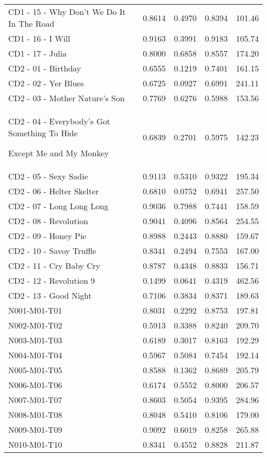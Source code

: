 \begin{longtable}[c]{|p{8cm}|c|l|l|l|}
CD1 - 15 - Why Don't We Do It In The Road & 0.8614 & 0.4970 & 0.8394 & 101.46 \\
CD1 - 16 - I Will & 0.9163 & 0.3991 & 0.9183 & 105.74 \\
CD1 - 17 - Julia & 0.8000 & 0.6858 & 0.8557 & 174.20 \\
CD2 - 01 - Birthday & 0.6555 & 0.1219 & 0.7401 & 161.15 \\
CD2 - 02 - Yer Blues & 0.6725 & 0.0927 & 0.6991 & 241.11 \\
CD2 - 03 - Mother Nature's Son & 0.7769 & 0.6276 & 0.5988 & 153.56 \\
CD2 - 04 - Everybody's Got Something To Hide \par Except Me and My Monkey &
0.6839 & 0.2701 & 0.5975 & 142.23 \\
CD2 - 05 - Sexy Sadie & 0.9113 & 0.5310 & 0.9322 & 195.34 \\
CD2 - 06 - Helter Skelter & 0.6810 & 0.0752 & 0.6941 & 257.50 \\
CD2 - 07 - Long Long Long & 0.9036 & 0.7988 & 0.7441 & 158.59 \\
CD2 - 08 - Revolution & 0.9041 & 0.4096 & 0.8564 & 254.55 \\
CD2 - 09 - Honey Pie & 0.8988 & 0.2443 & 0.8880 & 159.67 \\
CD2 - 10 - Savoy Truffle & 0.8341 & 0.2494 & 0.7553 & 167.00 \\
CD2 - 11 - Cry Baby Cry & 0.8787 & 0.4348 & 0.8833 & 156.71 \\
CD2 - 12 - Revolution 9 & 0.1499 & 0.0641 & 0.4319 & 462.56 \\
CD2 - 13 - Good Night & 0.7106 & 0.3834 & 0.8371 & 189.63 \\
N001-M01-T01 & 0.8031 & 0.2292 & 0.8753 & 197.81 \\
N002-M01-T02 & 0.5913 & 0.3388 & 0.8240 & 209.70 \\
N003-M01-T03 & 0.6189 & 0.3017 & 0.8163 & 192.29 \\
N004-M01-T04 & 0.5967 & 0.5084 & 0.7454 & 192.14 \\
N005-M01-T05 & 0.8588 & 0.1362 & 0.8689 & 205.79 \\
N006-M01-T06 & 0.6174 & 0.5552 & 0.8000 & 206.57 \\
N007-M01-T07 & 0.8603 & 0.5054 & 0.9395 & 284.96 \\
N008-M01-T08 & 0.8048 & 0.5410 & 0.8106 & 179.00 \\
N009-M01-T09 & 0.9092 & 0.6019 & 0.8258 & 265.88 \\
N010-M01-T10 & 0.8341 & 0.4552 & 0.8828 & 211.87 \\

\end{longtable}
